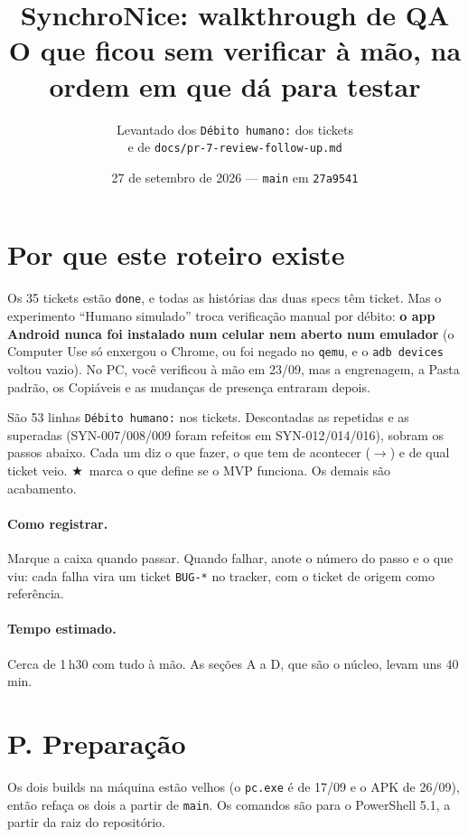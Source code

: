 \documentclass[11pt,a4paper]{article}
\title{SynchroNice: walkthrough de QA\\\large O que ficou sem verificar à mão, na ordem em que dá para testar}
\author{Levantado dos \texttt{Débito humano:} dos tickets\\e de \texttt{docs/pr-7-review-follow-up.md}}
\date{27 de setembro de 2026 --- \texttt{main} em \texttt{27a9541}}
\newcommand{\letra}{P}
\newcommand{\secao}[2]{\renewcommand{\letra}{#1}\section*{#1. #2}\addcontentsline{toc}{section}{#1. #2}}
\newcommand{\mvp}{\textcolor{mvp}{$\bigstar$}\ }
\begin{document}
\maketitle

\section*{Por que este roteiro existe}

Os 35 tickets estão \texttt{done}, e todas as histórias das duas specs têm
ticket. Mas o experimento ``Humano simulado'' troca verificação manual por
débito: \textbf{o app Android nunca foi instalado num celular nem aberto num
emulador} (o Computer Use só enxergou o Chrome, ou foi negado no
\texttt{qemu}, e o \texttt{adb devices} voltou vazio). No PC, você verificou à
mão em 23/09, mas a engrenagem, a Pasta padrão, os Copiáveis e as mudanças de
presença entraram depois.

São 53 linhas \texttt{Débito humano:} nos tickets. Descontadas as repetidas e
as superadas (SYN-007/008/009 foram refeitos em SYN-012/014/016), sobram os
passos abaixo. Cada um diz o que fazer, o que tem de acontecer
($\rightarrow$) e de qual ticket veio. \mvp marca o que define se o MVP
funciona. Os demais são acabamento.

\paragraph{Como registrar.} Marque a caixa quando passar. Quando falhar, anote o
número do passo e o que viu: cada falha vira um ticket \texttt{BUG-*} no
tracker, com o ticket de origem como referência.

\paragraph{Tempo estimado.} Cerca de 1\,h30 com tudo à mão. As seções A a D,
que são o núcleo, levam uns 40 min.

\tableofcontents

\secao{P}{Preparação}

Os dois builds na máquina estão velhos (o \texttt{pc.exe} é de 17/09 e o APK
de 26/09), então refaça os dois a partir de \texttt{main}. Os comandos são para
o PowerShell 5.1, a partir da raiz do repositório.
\end{document}
